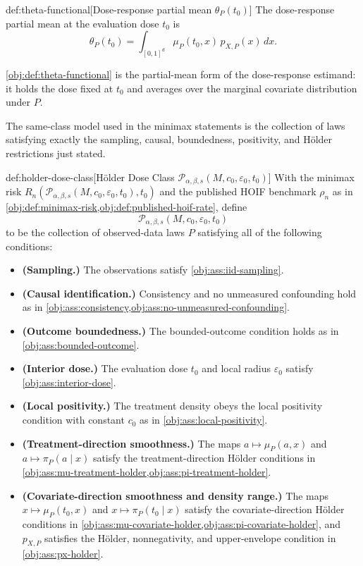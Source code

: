 \begin{definitionv}{def:theta-functional}[Dose-response partial mean $\theta_P(t_0)$]
The dose-response partial mean at the evaluation dose $t_0$ is
\[
\theta_P(t_0)
=
\int_{[0,1]^d} \mu_P(t_0,x)\,p_{X,P}(x)\,dx .
\]
\end{definitionv}

\cref{obj:def:theta-functional} is the partial-mean form of the dose-response estimand: it holds the dose fixed at \(t_0\) and averages over the marginal covariate distribution under \(P\).

The same-class model used in the minimax statements is the collection of laws satisfying exactly the sampling, causal, boundedness, positivity, and Hölder restrictions just stated.

\begin{definitionv}{def:holder-dose-class}[Hölder Dose Class \(\mathcal P_{\alpha,\beta,s}(M,c_0,\varepsilon_0,t_0)\)]
With the minimax risk \(R_n(\mathcal P_{\alpha,\beta,s}(M,c_0,\varepsilon_0,t_0),t_0)\) and the published HOIF benchmark \(\rho_n\) as in \cref{obj:def:minimax-risk,obj:def:published-hoif-rate}, define
\[
\mathcal P_{\alpha,\beta,s}(M,c_0,\varepsilon_0,t_0)
\]
to be the collection of observed-data laws \(P\) satisfying all of the following conditions:
\begin{itemize}
\item \textbf{(Sampling.)} The observations satisfy \cref{obj:ass:iid-sampling}.
\item \textbf{(Causal identification.)} Consistency and no unmeasured confounding hold as in \cref{obj:ass:consistency,obj:ass:no-unmeasured-confounding}.
\item \textbf{(Outcome boundedness.)} The bounded-outcome condition holds as in \cref{obj:ass:bounded-outcome}.
\item \textbf{(Interior dose.)} The evaluation dose \(t_0\) and local radius \(\varepsilon_0\) satisfy \cref{obj:ass:interior-dose}.
\item \textbf{(Local positivity.)} The treatment density obeys the local positivity condition with constant \(c_0\) as in \cref{obj:ass:local-positivity}.
\item \textbf{(Treatment-direction smoothness.)} The maps \(a\mapsto \mu_P(a,x)\) and \(a\mapsto \pi_P(a\mid x)\) satisfy the treatment-direction Hölder conditions in \cref{obj:ass:mu-treatment-holder,obj:ass:pi-treatment-holder}.
\item \textbf{(Covariate-direction smoothness and density range.)} The maps \(x\mapsto\mu_P(t_0,x)\) and \(x\mapsto\pi_P(t_0\mid x)\) satisfy the covariate-direction Hölder conditions in \cref{obj:ass:mu-covariate-holder,obj:ass:pi-covariate-holder}, and \(p_{X,P}\) satisfies the Hölder, nonnegativity, and upper-envelope condition in \cref{obj:ass:px-holder}.

\end{itemize}
\end{definitionv}
